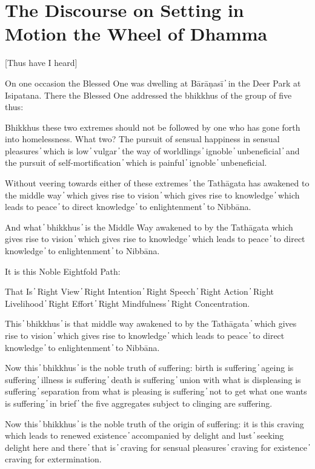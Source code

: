 \section{The Discourse on Setting in Motion the Wheel of Dhamma}

[Thus have I heard]

On one occasion the Blessed One was dwelling at Bārāṇasī  ̓  in the Deer Park at Isipatana. There the Blessed One addressed the bhikkhus of the group of five thus:

Bhikkhus these two extremes should not be followed by one who has gone forth into homelessness. What two? The pursuit of sensual happiness in sensual pleasures  ̓  which is low  ̓  vulgar  ̓  the way of worldlings  ̓  ignoble  ̓  unbeneficial  ̓  and the pursuit of self-mortification  ̓  which is painful  ̓  ignoble  ̓  unbeneficial.

Without veering towards either of these extremes  ̓  the Tathāgata has awakened to the middle way  ̓  which gives rise to vision  ̓  which gives rise to knowledge  ̓  which leads to peace  ̓  to direct knowledge  ̓  to enlightenment  ̓  to Nibbāna.

And what  ̓  bhikkhus  ̓  is the Middle Way awakened to by the Tathāgata which gives rise to vision  ̓  which gives rise to knowledge  ̓  which leads to peace  ̓  to direct knowledge  ̓  to enlightenment  ̓  to Nibbāna.

It is this Noble Eightfold Path:

That Is  ̓  Right View  ̓  Right Intention  ̓  Right Speech  ̓  Right Action  ̓  Right Livelihood  ̓  Right Effort  ̓  Right Mindfulness  ̓  Right Concentration.

This  ̓  bhikkhus  ̓  is that middle way awakened to by the Tathāgata  ̓  which gives rise to vision  ̓  which gives rise to knowledge  ̓  which leads to peace  ̓  to direct knowledge  ̓  to enlightenment  ̓  to Nibbāna.

Now this  ̓  bhikkhus  ̓  is the noble truth of suffering: birth is suffering  ̓  ageing is suffering  ̓  illness is suffering  ̓  death is suffering  ̓  union with what is displeasing is suffering  ̓  separation from what is pleasing is suffering  ̓  not to get what one wants is suffering  ̓  in brief  ̓  the five aggregates subject to clinging are suffering.

Now this  ̓  bhikkhus  ̓  is the noble truth of the origin of suffering: it is this craving which leads to renewed existence  ̓  accompanied by delight and lust  ̓  seeking delight here and there  ̓  that is  ̓  craving for sensual pleasures  ̓  craving for existence  ̓  craving for extermination.

